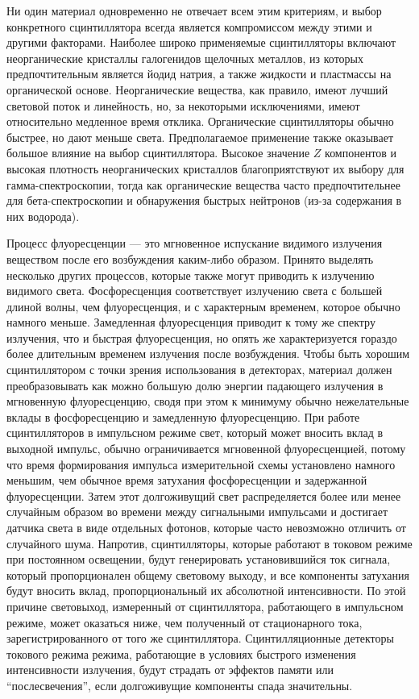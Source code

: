Ни один материал одновременно не отвечает всем этим критериям, и выбор конкретного сцинтиллятора всегда является компромиссом между этими и другими факторами. Наиболее широко применяемые сцинтилляторы включают неорганические кристаллы галогенидов щелочных металлов, из которых предпочтительным является йодид натрия, а также жидкости и пластмассы на органической основе. Неорганические вещества, как правило, имеют лучший световой поток и линейность, но, за некоторыми исключениями, имеют относительно медленное время отклика. Органические сцинтилляторы обычно быстрее, но дают меньше света. Предполагаемое применение также оказывает большое влияние на выбор сцинтиллятора. Высокое значение $Z$ компонентов и высокая плотность неорганических кристаллов благоприятствуют их выбору для гамма-спектроскопии, тогда как органические вещества часто предпочтительнее для бета-спектроскопии и обнаружения быстрых нейтронов (из-за содержания в них водорода).~\cite{Knoll2010}

Процесс флуоресценции --- это мгновенное испускание видимого излучения веществом после его возбуждения каким-либо образом. Принято выделять несколько других процессов, которые также могут приводить к излучению видимого света. Фосфоресценция соответствует излучению света с большей длиной волны, чем флуоресценция, и с характерным временем, которое обычно намного меньше. Замедленная флуоресценция приводит к тому же спектру излучения, что и быстрая флуоресценция, но опять же характеризуется гораздо более длительным временем излучения после возбуждения. Чтобы быть хорошим сцинтиллятором с точки зрения использования в детекторах, материал должен преобразовывать как можно большую долю энергии падающего излучения в мгновенную флуоресценцию, сводя при этом к минимуму обычно нежелательные вклады в фосфоресценцию и замедленную флуоресценцию. При работе сцинтилляторов в импульсном режиме свет, который может вносить вклад в выходной импульс, обычно ограничивается мгновенной флуоресценцией, потому что время формирования импульса измерительной схемы установлено намного меньшим, чем обычное время затухания фосфоресценции и задержанной флуоресценции. Затем этот долгоживущий свет распределяется более или менее случайным образом во времени между сигнальными импульсами и достигает датчика света в виде отдельных фотонов, которые часто невозможно отличить от случайного шума. Напротив, сцинтилляторы, которые работают в токовом режиме при постоянном освещении, будут генерировать установившийся ток сигнала, который пропорционален общему световому выходу, и все компоненты затухания будут вносить вклад, пропорциональный их абсолютной интенсивности. По этой причине световыход, измеренный от сцинтиллятора, работающего в импульсном режиме, может оказаться ниже, чем полученный от стационарного тока, зарегистрированного от того же сцинтиллятора. Сцинтилляционные детекторы токового режима режима, работающие в условиях быстрого изменения интенсивности излучения, будут страдать от эффектов памяти или ``послесвечения'', если долгоживущие компоненты спада значительны.~\cite{Knoll2010}

